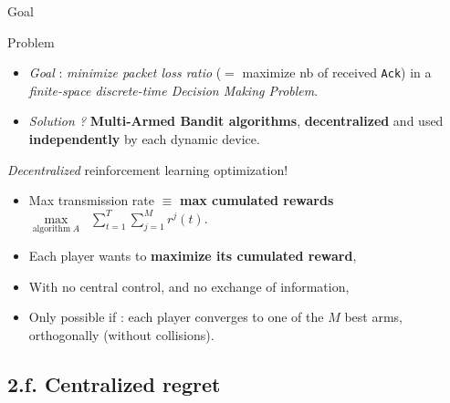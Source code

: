 \documentclass[12pt,english,ignorenonframetext,aspectratio=169,]{beamer}
\providecommand{\tightlist}{%
  \setlength{\itemsep}{0pt}\setlength{\parskip}{0pt}}
\begin{document}
\begin{frame}[fragile]{Goal}

\begin{block}{Problem}

\begin{itemize}
\tightlist
\item
  \emph{Goal} : \emph{minimize packet loss ratio} (\(=\) maximize nb of
  received \texttt{Ack}) in a \emph{finite-space discrete-time Decision
  Making Problem}.
\item
  \emph{Solution ?} \textbf{Multi-Armed Bandit algorithms},
  \textbf{decentralized} and used \textbf{independently} by each dynamic
  device.
\end{itemize}

\pause

\end{block}

\begin{block}{\emph{Decentralized} reinforcement learning optimization!}

\begin{itemize}
\tightlist
\item
  Max transmission rate \(\equiv\) \textbf{max cumulated rewards}
  \(\max\limits_{\text{algorithm}\;A} \;\; \sum\limits_{t=1}^{T} \sum\limits_{j=1}^M r^j(t)\).
\item
  Each player wants to \textbf{maximize its cumulated reward},
\item
  With no central control, and no exchange of information,
\item
  Only possible if : each player converges to one of the \(M\) best
  arms, orthogonally (without collisions).
\end{itemize}

\end{block}

\end{frame}



\subsection{\hfill{}2.f. Centralized regret\hfill{}}
\end{document}
